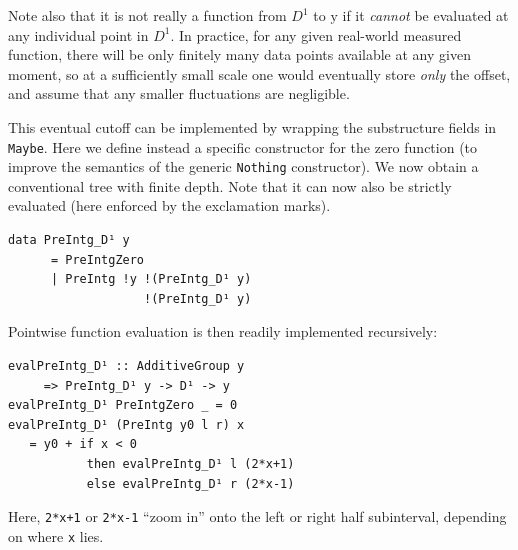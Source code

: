 \documentclass[final,sigplan]{acmart}\settopmatter{printfolios=true,printccs=false,printacmref=false}
\theoremstyle{acmplain}
\theoremstyle{acmdefinition}
\begin{document}
Note also that it is not really a function from $D^1$ to $\mathrm{y}$ if it \emph{cannot} be evaluated at any individual point in $D^1$.
In practice, for any given real-world measured function, there will be only finitely many data points available at any given moment,
so at a sufficiently small scale one would eventually store \emph{only} the offset,
and assume that any smaller fluctuations are negligible.

This eventual cutoff can be implemented by wrapping the substructure fields in \lstinline`Maybe`.
Here we define instead a specific constructor for the zero function (to improve the semantics of the generic \lstinline`Nothing` constructor).
We now obtain a conventional tree with finite depth.
Note that it can now also be strictly evaluated (here enforced by the exclamation marks).
\begin{lstlisting}
data PreIntg_D¹ y
      = PreIntgZero
      | PreIntg !y !(PreIntg_D¹ y)
                   !(PreIntg_D¹ y)
\end{lstlisting}
Pointwise function evaluation is then readily implemented recursively:
\begin{lstlisting}
evalPreIntg_D¹ :: AdditiveGroup y
     => PreIntg_D¹ y -> D¹ -> y
evalPreIntg_D¹ PreIntgZero _ = 0
evalPreIntg_D¹ (PreIntg y0 l r) x
   = y0 + if x < 0
           then evalPreIntg_D¹ l (2*x+1)
           else evalPreIntg_D¹ r (2*x-1)
\end{lstlisting}
Here, \lstinline`2*x+1` or \lstinline`2*x-1` “zoom in” onto the left or right half subinterval, depending on where \lstinline`x` lies.
\end{document}

